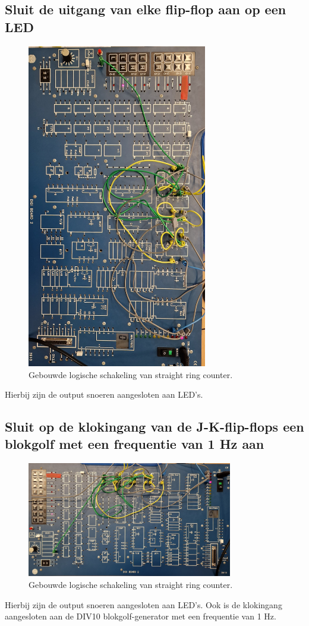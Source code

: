 \documentclass[12pt]{article}
\begin{document}
\subsection{Sluit de uitgang van elke flip-flop aan op een LED}
\begin{figure}[h]
    \centering
    \includegraphics[angle=90,width=0.7\textwidth]{1ring.jpg}
    \caption{Gebouwde logische schakeling van straight ring counter.}
    \label{fig:rs}
\end{figure} 
Hierbij zijn de output snoeren aangesloten aan LED's.
\pagebreak
\subsection{Sluit op de klokingang van de J-K-flip-flops een blokgolf met een frequentie van 1 Hz aan}
\begin{figure}[h]
    \centering
    \includegraphics[width=0.8\textwidth]{1rsaan.jpg}
    \caption{Gebouwde logische schakeling van straight ring counter.}
    \label{fig:rsaan}
\end{figure} 
Hierbij zijn de output snoeren aangesloten aan LED's. Ook is de klokingang aangesloten aan de DIV10 blokgolf-generator met een frequentie van 1 Hz.
\end{document}
